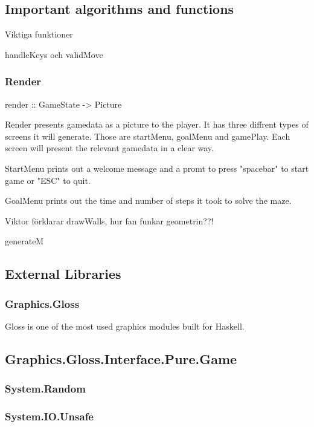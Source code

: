\documentclass[12pt, a4paper]{article}
\begin{document}
\subsection{Important algorithms and functions}
Viktiga funktioner

handleKeys och validMove

\subsubsection{Render}
\begin{code}
    render :: GameState -> Picture
\end{code}
Render presents gamedata as a picture to the player. It has three diffrent types of screens it will generate. Those are startMenu, goalMenu and gamePlay. Each screen will present the relevant gamedata in a clear way.

StartMenu prints out a welcome message and a promt to press "spacebar" to start game or "ESC" to quit.

GoalMenu prints out the time and number of steps it took to solve the maze. 








Viktor förklarar drawWalls, hur fan funkar geometrin??!

generateM

\subsection{External Libraries}

\subsubsection{Graphics.Gloss}
Gloss is one of the most used graphics modules built for Haskell.

\subsection{Graphics.Gloss.Interface.Pure.Game}

\subsubsection{System.Random}
\cite{System.Random}

\subsubsection{System.IO.Unsafe}
\end{document}
